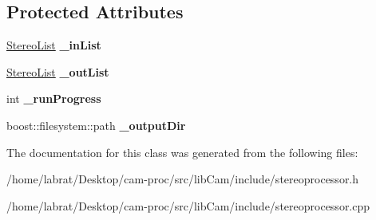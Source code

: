 \subsection*{Protected Attributes}
\begin{DoxyCompactItemize}
\item 
\hyperlink{classStereoList}{Stereo\+List} {\bfseries \+\_\+in\+List}\hypertarget{classStereoProcessor_a1df10f7350d38d268cdefd8504b5c718}{}\label{classStereoProcessor_a1df10f7350d38d268cdefd8504b5c718}

\item 
\hyperlink{classStereoList}{Stereo\+List} {\bfseries \+\_\+out\+List}\hypertarget{classStereoProcessor_a62e690b1b1c4df479d05caf7b6716c15}{}\label{classStereoProcessor_a62e690b1b1c4df479d05caf7b6716c15}

\item 
int {\bfseries \+\_\+run\+Progress}\hypertarget{classStereoProcessor_a1cc3586be4a3f0ca295ff336ae34c849}{}\label{classStereoProcessor_a1cc3586be4a3f0ca295ff336ae34c849}

\item 
boost\+::filesystem\+::path {\bfseries \+\_\+output\+Dir}\hypertarget{classStereoProcessor_aebea71e633f21beb718ca90494445b4f}{}\label{classStereoProcessor_aebea71e633f21beb718ca90494445b4f}

\end{DoxyCompactItemize}


The documentation for this class was generated from the following files\+:\begin{DoxyCompactItemize}
\item 
/home/labrat/\+Desktop/cam-\/proc/src/lib\+Cam/include/stereoprocessor.\+h\item 
/home/labrat/\+Desktop/cam-\/proc/src/lib\+Cam/include/stereoprocessor.\+cpp\end{DoxyCompactItemize}
